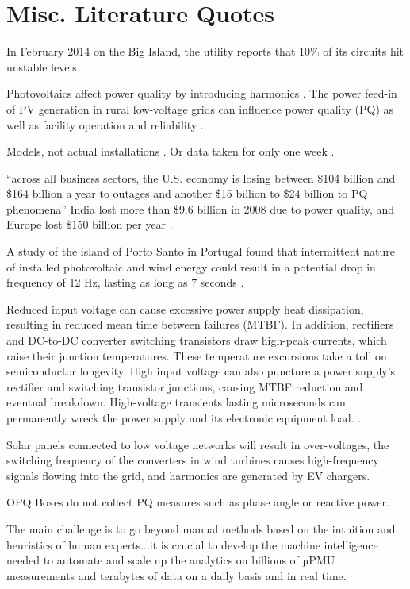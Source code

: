 \section{Misc. Literature Quotes}

In February 2014 on the Big Island, the utility reports that 10\% of its circuits hit unstable levels \cite{trabish_solar_2014}.

Photovoltaics affect power quality by introducing harmonics \cite{anurangi_effects_2017}. The power feed-in of PV generation in rural low-voltage grids can influence power quality (PQ) as well as facility operation and reliability \cite{rita_pinto_impact_2016}.

Models, not actual installations \cite{anurangi_effects_2017,bayindir_effects_2016,farhoodnea_power_2012,shafiullah_experimental_2014}. Or data taken for only one week \cite{kucuk_assessment_2013}.

``across all business sectors, the U.S. economy is losing between \$104 billion and \$164 billion a year to outages and another \$15 billion to \$24 billion to PQ phenomena'' \cite{elphick_summary_2015} India lost more than \$9.6 billion in 2008 due to power quality, and Europe lost \$150 billion per year \cite{laskar_power_2012}.

A study of the island of Porto Santo in Portugal found that intermittent nature of installed photovoltaic and wind energy could result in a potential drop in frequency of 12 Hz, lasting as long as 7 seconds \cite{delgado_solutions_2011}.

Reduced input voltage can cause excessive power supply heat dissipation, resulting in reduced mean time between failures (MTBF). In addition, rectifiers and DC-to-DC converter switching transistors draw high-peak currents, which raise their junction temperatures. These temperature excursions take a toll on semiconductor longevity. High input voltage can also puncture a power supply's rectifier and switching transistor junctions, causing MTBF reduction and eventual breakdown. High-voltage transients lasting microseconds can permanently wreck the power supply and its electronic equipment load. \cite{dedad_when_2008}.

Solar panels connected to low voltage networks will result in over-voltages, the switching frequency of the converters in wind turbines causes high-frequency signals flowing into the grid, and harmonics are generated by EV chargers. \cite{zavoda_power_2018}

OPQ Boxes do not collect PQ measures such as phase angle or reactive power.

The main challenge is to go beyond manual methods based on the intuition and heuristics of human experts...it is crucial to develop the machine intelligence needed to automate and scale up the analytics on billions of µPMU measurements and terabytes of data on a daily basis and in real time. \cite{mohsenian-rad_distribution_2018}

